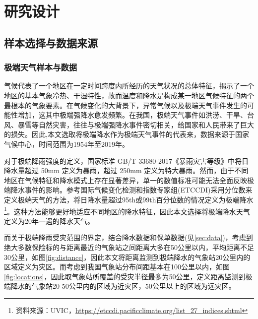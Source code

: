 \chapter{研究设计}\label{chap:3}
\section{样本选择与数据来源}
\subsection{极端天气样本与数据}\label{sec:def}

气候代表了一个地区在一定时间跨度内所经历的天气状况的总体特征，揭示了一个地区的基本气象冷热、干湿特性，故而温度和降水是构成某一地区气候特征的两个最根本的气象要素\citep{alexander2006global}。在气候变化的大背景下，异常气候以及极端天气事件发生的可能性增加\citep{aigner2023summary,donat2017addendum}，这其中极端强降水愈发频繁\citep{trenberth2010relationships}。在我国，极端天气事件如洪涝、干旱、台风、暴雪等自然灾害\citep{尹红2019基于}，往往与极端强降水事件密切相关，给国家和人民带来了巨大的损失。因此,本文选取将极端降水作为极端天气事件的代表来，数据来源于国家气候中心，时间范围为1954年至2019年。

对于极端降雨强度的定义，国家标准 GB/T 33680-2017《暴雨灾害等级》中将日降水量超过 50mm 定义为暴雨，超过 250mm 定义为特大暴雨。然而，由于不同地区在气候特征和降水模式上存在显著差异，单一的数值标准可能无法全面反映极端降水事件的影响。参考国际气候变化检测和指数专家组(ETCCDI)采用分位数来定义极端天气的方法，将日降水量超过95th或99th百分位数的情况定义为极端降水\footnote{资料来源：UVIC，\url{https://etccdi.pacificclimate.org/list_27_indices.shtml}}。这种方法能够更好地适应不同地区的降水特征\citep{karl1999clivar}，因此本文选择将极端降水天气定义为20年一遇的降水天气。

而关于极端降雨受灾范围的界定，结合降水数据和保单数据(见\ref{sec:data})，考虑到绝大多数保险标的与距离最近的气象站之间距离大多在50公里以内，平均距离不足30公里，如图\ref{fig:distance}，因此本文将距离监测到极端降水的气象站20公里内的区域定义为灾区。而考虑到我国气象站分布间距基本在100公里以内，如图\ref{fig:locations}，因此取气象站所覆盖的受灾半径最多为50公里，定义距离监测到极端降水的气象站20-50公里内的区域为近灾区，50公里以上的区域为远灾区。

